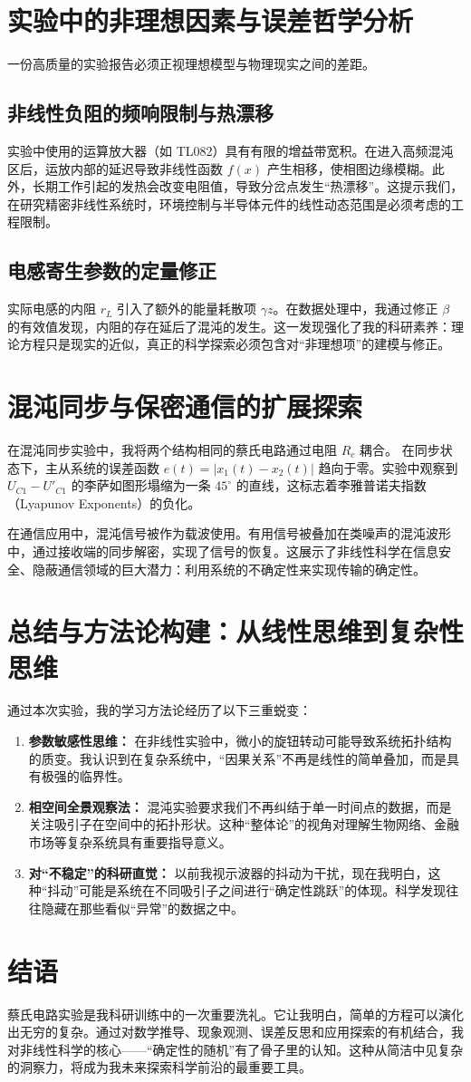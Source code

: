 \documentclass[12pt,a4paper]{article}
\begin{document}
\section{实验中的非理想因素与误差哲学分析}

一份高质量的实验报告必须正视理想模型与物理现实之间的差距。

\subsection{非线性负阻的频响限制与热漂移}
实验中使用的运算放大器（如 TL082）具有有限的增益带宽积。在进入高频混沌区后，运放内部的延迟导致非线性函数 $f(x)$ 产生相移，使相图边缘模糊。此外，长期工作引起的发热会改变电阻值，导致分岔点发生“热漂移”。这提示我们，在研究精密非线性系统时，环境控制与半导体元件的线性动态范围是必须考虑的工程限制。

\subsection{电感寄生参数的定量修正}
实际电感的内阻 $r_L$ 引入了额外的能量耗散项 $\gamma z$。在数据处理中，我通过修正 $\beta$ 的有效值发现，内阻的存在延后了混沌的发生。这一发现强化了我的科研素养：理论方程只是现实的近似，真正的科学探索必须包含对“非理想项”的建模与修正。

\section{混沌同步与保密通信的扩展探索}

在混沌同步实验中，我将两个结构相同的蔡氏电路通过电阻 $R_c$ 耦合。
在同步状态下，主从系统的误差函数 $e(t) = |x_1(t) - x_2(t)|$ 趋向于零。实验中观察到 $U_{C1}-U'_{C1}$ 的李萨如图形塌缩为一条 $45^\circ$ 的直线，这标志着李雅普诺夫指数（Lyapunov Exponents）的负化。

在通信应用中，混沌信号被作为载波使用。有用信号被叠加在类噪声的混沌波形中，通过接收端的同步解密，实现了信号的恢复。这展示了非线性科学在信息安全、隐蔽通信领域的巨大潜力：利用系统的不确定性来实现传输的确定性。

\section{总结与方法论构建：从线性思维到复杂性思维}

通过本次实验，我的学习方法论经历了以下三重蜕变：
\begin{enumerate}
    \item \textbf{参数敏感性思维：} 在非线性实验中，微小的旋钮转动可能导致系统拓扑结构的质变。我认识到在复杂系统中，“因果关系”不再是线性的简单叠加，而是具有极强的临界性。
    \item \textbf{相空间全景观察法：} 混沌实验要求我们不再纠结于单一时间点的数据，而是关注吸引子在空间中的拓扑形状。这种“整体论”的视角对理解生物网络、金融市场等复杂系统具有重要指导意义。
    \item \textbf{对“不稳定”的科研直觉：} 以前我视示波器的抖动为干扰，现在我明白，这种“抖动”可能是系统在不同吸引子之间进行“确定性跳跃”的体现。科学发现往往隐藏在那些看似“异常”的数据之中。
\end{enumerate}

\section{结语}
蔡氏电路实验是我科研训练中的一次重要洗礼。它让我明白，简单的方程可以演化出无穷的复杂。通过对数学推导、现象观测、误差反思和应用探索的有机结合，我对非线性科学的核心——“确定性的随机”有了骨子里的认知。这种从简洁中见复杂的洞察力，将成为我未来探索科学前沿的最重要工具。
\end{document}
